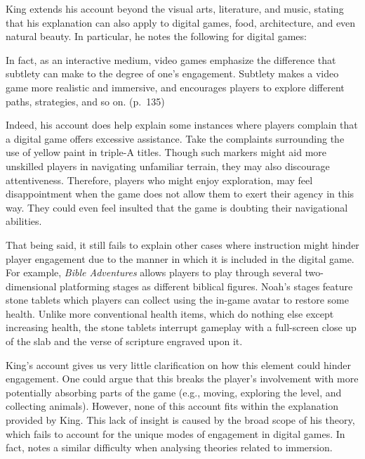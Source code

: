 King extends his account beyond the visual arts, literature, and music, stating that his explanation can also apply to digital games, food, architecture, and even natural beauty. In particular, he notes the following for digital games:

\begin{displayquote}
In fact, as an interactive medium, video games emphasize the difference that subtlety can make to the degree of one’s engagement. Subtlety makes a video game more realistic and immersive, and encourages players to explore different paths, strategies, and so on. (p.~135)
\end{displayquote}

Indeed, his account does help explain some instances where players complain that a digital game offers excessive assistance. Take the complaints surrounding the use of yellow paint in triple-A titles. Though such markers might aid more unskilled players in navigating unfamiliar terrain, they may also discourage attentiveness. Therefore, players who might enjoy exploration, may feel disappointment when the game does not allow them to exert their agency in this way. They could even feel insulted that the game is doubting their navigational abilities.

That being said, it still fails to explain other cases where instruction might hinder player engagement due to the manner in which it is included in the digital game. For example, \textit{Bible Adventures} \textcite{wisdom_tree_bible_1991} allows players to play through several two-dimensional platforming stages as different biblical figures. Noah's stages feature stone tablets which players can collect using the in-game avatar to restore some health. Unlike more conventional health items, which do nothing else except increasing health, the stone tablets interrupt gameplay with a full-screen close up of the slab and the verse of scripture engraved upon it. 

King's account gives us very little clarification on how this element could hinder engagement. One could argue that this breaks the player's involvement with more potentially absorbing parts of the game (e.g., moving, exploring the level, and collecting animals). However, none of this account fits within the explanation provided by King. This lack of insight is caused by the broad scope of his theory, which fails to account for the unique modes of engagement in digital games. In fact, \textcite[Chapter 2]{calleja_in_game_2011} notes a similar difficulty when analysing theories related to immersion.

